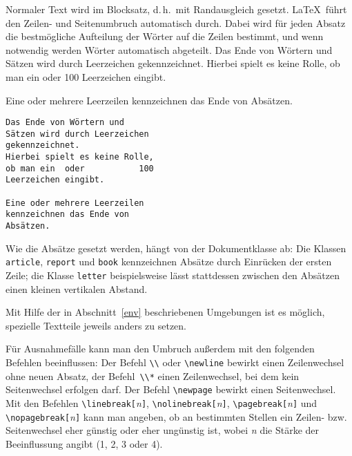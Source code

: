 Normaler Text wird im Blocksatz, d.\,h.~mit Randausgleich
gesetzt.  \LaTeX\ führt den Zeilen- und Seitenumbruch
automatisch durch.  Dabei wird für jeden Absatz die
bestmögliche Aufteilung der Wörter auf die Zeilen bestimmt,
und wenn notwendig werden Wörter automatisch abgeteilt.
\exa
\parindent=17pt\relax
\noindent Das Ende von Wörtern und Sätzen wird durch Leerzeichen
gekennzeichnet.  Hierbei spielt es keine Rolle, ob man ein oder
100 Leerzeichen eingibt.
\par
Eine oder mehrere Leerzeilen
kennzeichnen das Ende von
Absätzen.
\exb
\begin{verbatim}
Das Ende von Wörtern und
Sätzen wird durch Leerzeichen 
gekennzeichnet.
Hierbei spielt es keine Rolle,
ob man ein  oder           100
Leerzeichen eingibt.
 
Eine oder mehrere Leerzeilen
kennzeichnen das Ende von
Absätzen.
\end{verbatim}
\exc
Wie die Absätze gesetzt werden, hängt von der Dokumentklasse ab: 
Die Klassen 
\texttt{article}, \texttt{report} und \texttt{book} kennzeichnen
Absätze durch Einrücken der ersten Zeile;
die Klasse \texttt{letter} beispielsweise lässt stattdessen 
zwischen den Absätzen einen kleinen vertikalen Abstand.%


Mit Hilfe der in Abschnitt~\ref{env} beschriebenen Umgebungen ist
es möglich, spezielle Textteile jeweils anders zu setzen.
 
Für Ausnahmefälle kann man den Umbruch außerdem mit den
folgenden Befehlen beeinflussen:
Der Befehl \verb|\\| oder \verb|\newline| bewirkt einen
Zeilenwechsel ohne neuen Absatz, der Befehl~\verb|\\*| einen
Zeilenwechsel, bei dem kein Seitenwechsel erfolgen darf.
Der Befehl \verb|\newpage| bewirkt einen Seitenwechsel.
Mit den Befehlen
\verb|\linebreak[|\textit{n}\verb|]|,
\verb|\nolinebreak[|\textit{n}\verb|]|,
\verb|\pagebreak[|\textit{n}\verb|]|   und
\verb|\nopagebreak[|\textit{n}\verb|]|
kann man angeben, ob an bestimmten Stellen ein Zeilen- bzw.\ %
Seitenwechsel eher günstig oder eher ungünstig ist, wobei
\textit{n} die Stärke der Beeinflussung angibt (1, 2, 3 oder 4).

